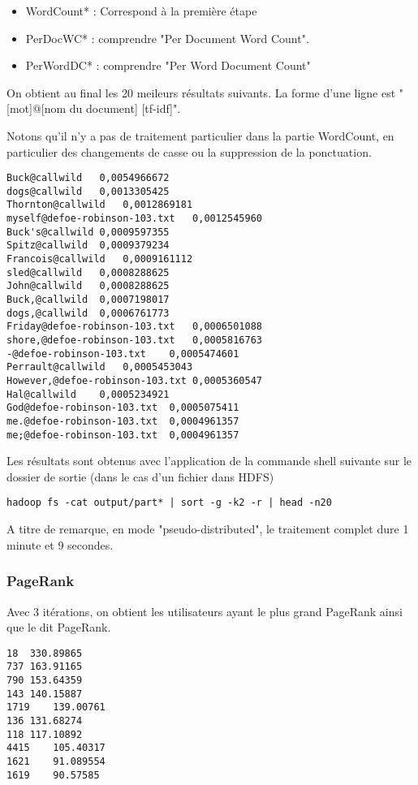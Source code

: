 \documentclass[french]{article}
\begin{document}
\begin{itemize}
	\item WordCount* : Correspond à la première étape
	\item PerDocWC* : comprendre "Per Document Word Count".
	\item PerWordDC* : comprendre "Per Word Document Count"
\end{itemize}

On obtient au final les 20 meileurs résultats suivants. La forme d'une ligne est "[mot]@[nom du document]    [tf-idf]".

Notons qu'il n'y a pas de traitement particulier dans la partie WordCount, en particulier des changements de casse ou la suppression de la ponctuation.


\begin{verbatim}
Buck@callwild	0,0054966672
dogs@callwild	0,0013305425
Thornton@callwild	0,0012869181
myself@defoe-robinson-103.txt	0,0012545960
Buck's@callwild	0,0009597355
Spitz@callwild	0,0009379234
Francois@callwild	0,0009161112
sled@callwild	0,0008288625
John@callwild	0,0008288625
Buck,@callwild	0,0007198017
dogs,@callwild	0,0006761773
Friday@defoe-robinson-103.txt	0,0006501088
shore,@defoe-robinson-103.txt	0,0005816763
-@defoe-robinson-103.txt	0,0005474601
Perrault@callwild	0,0005453043
However,@defoe-robinson-103.txt	0,0005360547
Hal@callwild	0,0005234921
God@defoe-robinson-103.txt	0,0005075411
me.@defoe-robinson-103.txt	0,0004961357
me;@defoe-robinson-103.txt	0,0004961357
\end{verbatim}

Les résultats sont obtenus avec l'application de la commande shell suivante sur le dossier de sortie (dans le cas d'un fichier dans HDFS)

\begin{verbatim}
hadoop fs -cat output/part* | sort -g -k2 -r | head -n20
\end{verbatim}

A titre de remarque, en mode "pseudo-distributed", le traitement complet dure 1 minute et 9 secondes.

\subsubsection{PageRank}

Avec 3 itérations, on obtient les utilisateurs ayant le plus grand PageRank ainsi que le dit PageRank.

\begin{verbatim}
18	330.89865
737	163.91165
790	153.64359
143	140.15887
1719	139.00761
136	131.68274
118	117.10892
4415	105.40317
1621	91.089554
1619	90.57585
\end{verbatim}
\end{document}
